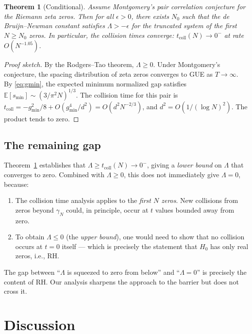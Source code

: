 \documentclass[11pt,a4paper]{article}
\newtheorem{theorem}{Theorem}
\begin{document}
\begin{theorem}[Conditional]\label{thm:conditional}
  Assume Montgomery's pair correlation conjecture for the Riemann
  zeta zeros. Then for all $\epsilon > 0$, there exists $N_0$ such
  that the de Bruijn--Newman constant satisfies $\Lambda >
  -\epsilon$ for the truncated system of the first $N \geq N_0$
  zeros. In particular, the collision times converge:
  $t_{\mathrm{coll}}(N) \to 0^-$ at rate $O(N^{-1.05})$.
\end{theorem}

\begin{proof}[Proof sketch]
By the Rodgers--Tao theorem, $\Lambda \geq 0$. Under Montgomery's
conjecture, the spacing distribution of zeta zeros converges to GUE
as $T \to \infty$. By \eqref{eq:gmin}, the expected minimum
normalized gap satisfies $\mathbb{E}[s_{\min}] \sim (3/\pi^2
N)^{1/3}$. The collision time for this pair is $t_{\mathrm{coll}} =
-g_{\min}^2/8 + O(g_{\min}^4/d^2) = O(d^2 N^{-2/3})$, and $d^2 =
O(1/(\log N)^2)$. The product tends to zero.
\end{proof}

\subsection{The remaining gap}

Theorem~\ref{thm:conditional} establishes that $\Lambda \geq
t_{\mathrm{coll}}(N) \to 0^-$, giving a \emph{lower bound} on
$\Lambda$ that converges to zero. Combined with $\Lambda \geq 0$,
this does not immediately give $\Lambda = 0$, because:

\begin{enumerate}
  \item The collision time analysis applies to the \emph{first $N$
    zeros}. New collisions from zeros beyond $\gamma_N$ could, in
    principle, occur at $t$ values bounded away from zero.
  \item To obtain $\Lambda \leq 0$ (the \emph{upper bound}), one
    would need to show that no collision occurs at $t = 0$ itself ---
    which is precisely the statement that $H_0$ has only real zeros,
    i.e., RH.
\end{enumerate}

The gap between ``$\Lambda$ is squeezed to zero from below'' and
``$\Lambda = 0$'' is precisely the content of RH. Our analysis
sharpens the approach to the barrier but does not cross it.

\section{Discussion}\label{sec:discussion}
\end{document}
